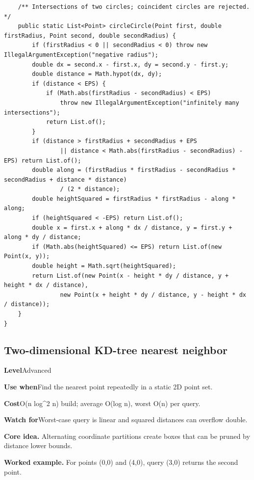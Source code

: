 \documentclass[10pt,letterpaper]{article}
\newcommand{\entrylabel}[1]{\textcolor{accent}{\bfseries #1}}
\begin{document}
\begin{lstlisting}
    /** Intersections of two circles; coincident circles are rejected. */
    public static List<Point> circleCircle(Point first, double firstRadius, Point second, double secondRadius) {
        if (firstRadius < 0 || secondRadius < 0) throw new IllegalArgumentException("negative radius");
        double dx = second.x - first.x, dy = second.y - first.y;
        double distance = Math.hypot(dx, dy);
        if (distance < EPS) {
            if (Math.abs(firstRadius - secondRadius) < EPS)
                throw new IllegalArgumentException("infinitely many intersections");
            return List.of();
        }
        if (distance > firstRadius + secondRadius + EPS
                || distance < Math.abs(firstRadius - secondRadius) - EPS) return List.of();
        double along = (firstRadius * firstRadius - secondRadius * secondRadius + distance * distance)
                / (2 * distance);
        double heightSquared = firstRadius * firstRadius - along * along;
        if (heightSquared < -EPS) return List.of();
        double x = first.x + along * dx / distance, y = first.y + along * dy / distance;
        if (Math.abs(heightSquared) <= EPS) return List.of(new Point(x, y));
        double height = Math.sqrt(heightSquared);
        return List.of(new Point(x - height * dy / distance, y + height * dx / distance),
                new Point(x + height * dy / distance, y - height * dx / distance));
    }
}
\end{lstlisting}
\subsection{Two-dimensional KD-tree nearest neighbor}
\begin{guidebox}\small
\entrylabel{Level}\quad Advanced\par
\entrylabel{Use when}\quad Find the nearest point repeatedly in a static 2D point set.\par
\entrylabel{Cost}\quad O(n log\textasciicircum{}2 n) build; average O(log n), worst O(n) per query.\par
\entrylabel{Watch for}\quad Worst-case query is linear and squared distances can overflow double.\par
\end{guidebox}
\noindent\textbf{Core idea.} Alternating coordinate partitions create boxes that can be pruned by distance lower bounds.\par
\noindent\textbf{Worked example.} For points (0,0) and (4,0), query (3,0) returns the second point.\par
\end{document}
